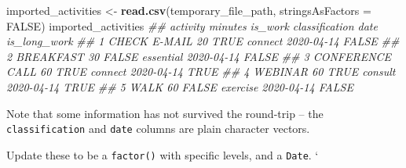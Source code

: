 \documentclass[
]{book}
\newenvironment{Shaded}{\begin{snugshade}}{\end{snugshade}}
\newcommand{\CommentTok}[1]{\textcolor[rgb]{0.56,0.35,0.01}{\textit{#1}}}
\newcommand{\DataTypeTok}[1]{\textcolor[rgb]{0.13,0.29,0.53}{#1}}
\newcommand{\KeywordTok}[1]{\textcolor[rgb]{0.13,0.29,0.53}{\textbf{#1}}}
\newcommand{\NormalTok}[1]{#1}
\newcommand{\OperatorTok}[1]{\textcolor[rgb]{0.81,0.36,0.00}{\textbf{#1}}}
\newcommand{\OtherTok}[1]{\textcolor[rgb]{0.56,0.35,0.01}{#1}}
\newcommand{\StringTok}[1]{\textcolor[rgb]{0.31,0.60,0.02}{#1}}
\begin{document}
\begin{Shaded}
\begin{Highlighting}[]
\NormalTok{imported_activities <-}\StringTok{ }\KeywordTok{read.csv}\NormalTok{(temporary_file_path, }\DataTypeTok{stringsAsFactors =} \OtherTok{FALSE}\NormalTok{)}
\NormalTok{imported_activities}
\CommentTok{##          activity minutes is_work classification       date is_long_work}
\CommentTok{## 1    CHECK E-MAIL      20    TRUE        connect 2020-04-14        FALSE}
\CommentTok{## 2       BREAKFAST      30   FALSE      essential 2020-04-14        FALSE}
\CommentTok{## 3 CONFERENCE CALL      60    TRUE        connect 2020-04-14         TRUE}
\CommentTok{## 4         WEBINAR      60    TRUE        consult 2020-04-14         TRUE}
\CommentTok{## 5            WALK      60   FALSE       exercise 2020-04-14        FALSE}
\end{Highlighting}
\end{Shaded}

Note that some information has not survived the round-trip -- the \texttt{classification} and \texttt{date} columns are plain character vectors.

\begin{Shaded}
\end{Shaded}

Update these to be a \texttt{factor()} with specific levels, and a \texttt{Date}.
`
\end{document}
